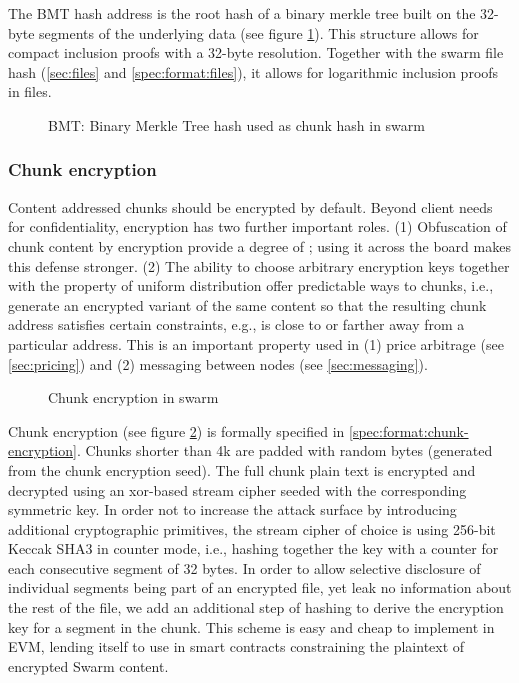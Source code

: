 The BMT hash address is the root hash of a binary merkle tree built on the  32-byte segments of the underlying data (see figure \ref{fig:BMT}). This structure  allows for compact inclusion proofs with a 32-byte resolution. Together with the swarm file hash (\ref{sec:files} and \ref{spec:format:files}), it allows for logarithmic inclusion proofs in files. 


\begin{figure}[htbp]
   \centering
   \caption{BMT: Binary Merkle Tree hash used as chunk hash in swarm}
   \label{fig:BMT}
\end{figure}


\subsubsection{Chunk encryption}\label{sec:chunk-encryption}

Content addressed chunks should be encrypted by default. Beyond client needs for confidentiality, encryption has two further important roles. (1) Obfuscation of chunk content by encryption  provide a degree of ; using it across the board makes this defense stronger. (2) The ability to choose arbitrary encryption keys together with the property of uniform distribution offer predictable ways to  chunks, i.e., generate an encrypted variant of the same content so that the resulting chunk address satisfies certain constraints, e.g., is close to or farther away from a particular address. This is an important property used in (1) price arbitrage (see \ref{sec:pricing}) and (2) messaging between nodes (see \ref{sec:messaging}).


\begin{figure}[htbp]
   \centering
   \caption{Chunk encryption in swarm}
   \label{fig:chunk-encryption}
\end{figure}


Chunk encryption (see figure \ref{fig:chunk-encryption}) is formally specified in \ref{spec:format:chunk-encryption}. Chunks shorter than 4k are padded with random bytes (generated from the chunk encryption seed). The full chunk plain text is encrypted and decrypted using an xor-based stream cipher seeded with the corresponding symmetric key. In order not to increase the attack surface by introducing additional cryptographic primitives, the stream cipher of choice is using 256-bit Keccak SHA3 in counter mode, i.e., hashing together the key with a counter for each consecutive segment of 32 bytes. In order to allow selective disclosure of individual segments being part of an encrypted file, yet leak no information about the rest of the file, we add an additional step of hashing to  derive the encryption key for a segment in the chunk. This scheme is easy and cheap to implement in EVM, lending itself to use in smart contracts constraining the plaintext of encrypted Swarm content. 

